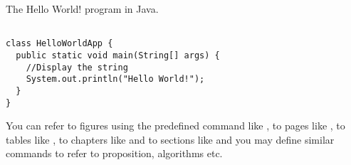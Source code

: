 \begin{algorithm}[h]
  \caption{The Hello World! program in Java.}
  \label{hello_world}
  \begin{verbatim}
  
class HelloWorldApp {
  public static void main(String[] args) {
    //Display the string
    System.out.println("Hello World!");
  }
}
\end{verbatim}
\end{algorithm}

You can refer to figures using the predefined command like , to pages like , to tables like , to chapters like  and to sections like  and you may define similar commands to refer to proposition, algorithms etc.
